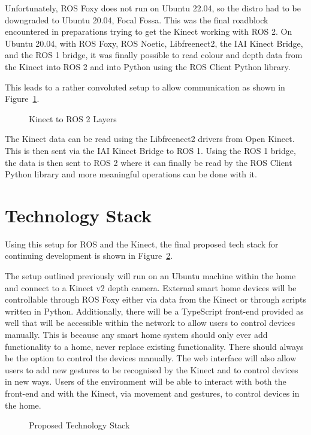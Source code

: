 Unfortunately, ROS Foxy does not run on Ubuntu 22.04, so the distro had to be downgraded to Ubuntu 20.04, Focal Fossa.
This was the final roadblock encountered in preparations trying to get the Kinect working with ROS 2.
On Ubuntu 20.04, with ROS Foxy, ROS Noetic, Libfreenect2, the IAI Kinect Bridge, and the ROS 1 bridge, it was finally possible to read colour and depth data from the Kinect into ROS 2 and into Python using the ROS Client Python library.

This leads to a rather convoluted setup to allow communication as shown in Figure~\ref{fig:kinect_ros}.

\begin{figure}[!htb]
    \caption{Kinect to ROS 2 Layers}
    \label{fig:kinect_ros}
\end{figure}

The Kinect data can be read using the Libfreenect2 drivers from Open Kinect.
This is then sent via the IAI Kinect Bridge to ROS 1.
Using the ROS 1 bridge, the data is then sent to ROS 2 where it can finally be read by the ROS Client Python library and more meaningful operations can be done with it.

\section{Technology Stack}
Using this setup for ROS and the Kinect, the final proposed tech stack for continuing development is shown in Figure~\ref{fig:tech_stack}.

The setup outlined previously will run on an Ubuntu machine within the home and connect to a Kinect v2 depth camera.
External smart home devices will be controllable through ROS Foxy either via data from the Kinect or through scripts written in Python.
Additionally, there will be a TypeScript front-end provided as well that will be accessible within the network to allow users to control devices manually.
This is because any smart home system should only ever add functionality to a home, never replace existing functionality.
There should always be the option to control the devices manually.
The web interface will also allow users to add new gestures to be recognised by the Kinect and to control devices in new ways.
Users of the environment will be able to interact with both the front-end and with the Kinect, via movement and gestures, to control devices in the home.

\begin{figure}[H]
    \caption{Proposed Technology Stack}
    \label{fig:tech_stack}
\end{figure}

